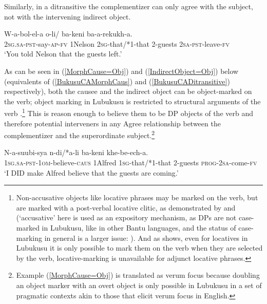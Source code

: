\noindent Similarly, in a ditransitive the complementizer can only agree with the subject, not with the intervening indirect object.

\ea \label{BukusuCADitransitive}
\gll W-a-bol-el-a  o-li/ ba-keni ba-a-rekukh-a. \\
2\textsc{sg}.\textsc{sa}-\textsc{pst}-say-\textsc{ap}-\textsc{fv}	1Nelson	2\textsc{sg}-that/*1-that	2-guests	2\textsc{sa}-\textsc{pst}-leave-\textsc{fv} \\
\glt `You told Nelson that the guests left.'

\z
\noindent As can be seen in (\ref{MorphCause=Obj}) and (\ref{IndirectObject=Obj}) below (equivalents of (\ref{BukusuCAMorphCaus}) and (\ref{BukusuCADitransitive}) respectively), both the causee and the indirect object can be object-marked on the verb; object marking in Lubukusu is restricted to structural arguments of the verb \citep{Diercks:2011,SikukuEt:2017}.\footnote{Non-accusative objects like locative phrases may be marked on the verb, but are marked with a post-verbal locative clitic, as demonstrated by \citet{Diercks:2010,Diercks:2011} and \citet{SikukuEt:2017} (`accusative' here is used as an expository mechanism, as DPs are not case-marked in Lubukusu, like in other Bantu languages, and the status of case-marking in general is a larger issue: \citealt{Harford:1985,Halpert:2012,Diercks:2012,vanderwal:2015}). And as \citet{Diercks:2011} shows, even for locatives in Lubukusu it is only possible to mark them on the verb when they are selected by the verb, locative-marking is unavailable for adjunct locative phrases.}  This is reason enough to believe them to be DP objects of the verb and therefore potential interveners in any Agree relationship between the complementizer and the superordinate subject.\footnote{Example (\ref{MorphCause=Obj}) is translated as verum focus because doubling an object marker with an overt object is only possible in Lubukusu in a set of pragmatic contexts akin to those that elicit verum focus in English.}

\newpage 

\ea \label{MorphCause=Obj}
\gll N-a-suubi-sya  n-di/*a-li ba-keni khe-be-ech-a.	\\
1\textsc{sg}.\textsc{sa}-\textsc{pst}-1\textsc{om}-believe-\textsc{caus} 1Alfred 1\textsc{sg}-that/*1-that 2-guests \textsc{prog}-2\textsc{sa}-come-\textsc{fv} \\
\glt `I DID make Alfred believe that the guests are coming.'
\z

